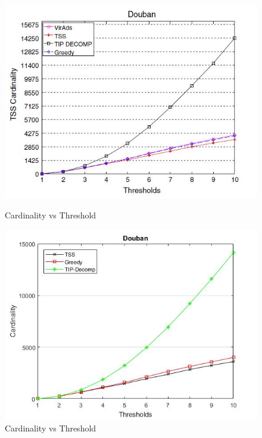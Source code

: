 \begin{figure}[h!]
\begin{minipage}[t]{0.50\textwidth}
\includegraphics[width=\linewidth,keepaspectratio=true]{images/doubanpaper.jpg}
\caption{Cardinality vs Threshold}

\end{minipage}
\begin{minipage}[t]{0.50\textwidth}
\includegraphics[width=\linewidth,keepaspectratio=true]{images/doubanresult.jpg}
\caption{Cardinality vs Threshold}
\end{minipage}
\end{figure}

